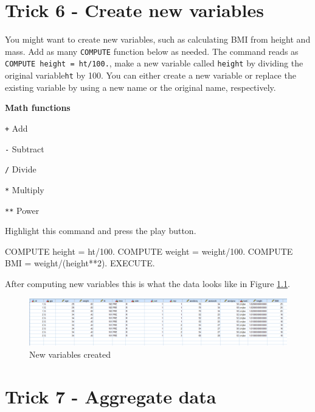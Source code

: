 \documentclass[
]{book}
\newenvironment{Shaded}{\begin{snugshade}}{\end{snugshade}}
\newcommand{\DecValTok}[1]{\textcolor[rgb]{0.00,0.00,0.81}{#1}}
\newcommand{\FloatTok}[1]{\textcolor[rgb]{0.00,0.00,0.81}{#1}}
\newcommand{\NormalTok}[1]{#1}
\newcommand{\OtherTok}[1]{\textcolor[rgb]{0.56,0.35,0.01}{#1}}
\newcommand{\SpecialCharTok}[1]{\textcolor[rgb]{0.00,0.00,0.00}{#1}}
\begin{document}
\hypertarget{trick6}{%
\chapter{Trick 6 - Create new variables}\label{trick6}}

You might want to create new variables, such as calculating BMI from height and mass. Add as many \texttt{COMPUTE} function below as needed. The command reads as \texttt{COMPUTE\ height\ =\ ht/100.}, make a new variable called \texttt{height} by dividing the original variable\texttt{ht} by 100. You can either create a new variable or replace the existing variable by using a new name or the original name, respectively.

\textbf{Math functions}

\texttt{+} Add

\texttt{-} Subtract

\texttt{/} Divide

\texttt{*} Multiply

\texttt{**} Power

Highlight this command and press the play button.

\begin{Shaded}
\begin{Highlighting}[]
\NormalTok{COMPUTE height }\OtherTok{=}\NormalTok{ ht}\SpecialCharTok{/}\FloatTok{100.} 
\NormalTok{COMPUTE weight }\OtherTok{=}\NormalTok{ weight}\SpecialCharTok{/}\FloatTok{100.}
\NormalTok{COMPUTE BMI }\OtherTok{=}\NormalTok{ weight}\SpecialCharTok{/}\NormalTok{(height}\SpecialCharTok{**}\DecValTok{2}\NormalTok{).}
\NormalTok{EXECUTE.}
\end{Highlighting}
\end{Shaded}

After computing new variables this is what the data looks like in Figure \ref{fig:mutate}.

\begin{figure}
\includegraphics[width=1\linewidth]{images/mutate} \caption{New variables created}\label{fig:mutate}
\end{figure}

\hypertarget{trick7}{%
\chapter{Trick 7 - Aggregate data}\label{trick7}}
\end{document}
